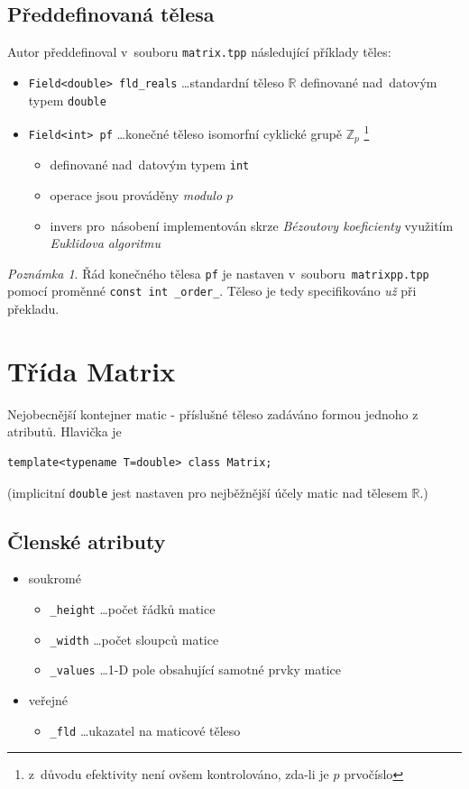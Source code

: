 \documentclass[11pt,a4paper]{article}
\newcommand{\R}{\mathbb{R}}
\theoremstyle{remark}
\newtheorem{note}[thm]{Poznámka}
\begin{document}
\subsection{Předdefinovaná tělesa}
 
Autor předdefinoval v~souboru \verb=matrix.tpp= následující příklady těles:
\begin{itemize}
  \item \verb=Field<double> fld_reals= \ldots standardní těleso $\R$ definované
    nad~datovým typem \verb=double=
  \item \verb=Field<int> pf= \ldots konečné těleso isomorfní cyklické grupě
    $\mathbb{Z}_p$\thinspace%
    \footnote{z~důvodu efektivity není ovšem kontrolováno, zda-li je $p$
    prvočíslo}
    \begin{itemize}
      \item definované nad~datovým typem \verb=int=
      \item operace jsou prováděny \emph{modulo $p$\/}
      \item invers pro~násobení implementován skrze \emph{Bézoutovy
        koeficienty\/} využitím \emph{Euklidova algoritmu\/}
    \end{itemize}
\end{itemize}

\begin{note}
  Řád konečného tělesa \verb=pf= je nastaven v~souboru~\verb=matrixpp.tpp=
  pomocí proměnné \verb=const int _order_=.
  Těleso je tedy specifikováno \emph{už\/} při překladu.
\end{note}

\section{Třída Matrix}

Nejobecnější kontejner matic - příslušné těleso zadáváno formou jednoho z
atributů.
Hlavička je
\begin{verbatim}
template<typename T=double> class Matrix;
\end{verbatim}
(implicitní \verb=double= jest nastaven pro nejběžnější účely matic nad tělesem
$\R$.)

\subsection{Členské atributy}

\begin{itemize}
  \item soukromé
  \begin{itemize}
    \item \verb=_height= \ldots počet řádků matice
    \item \verb=_width= \ldots počet sloupců matice
    \item \verb=_values= \ldots 1-D pole obsahující samotné prvky matice
  \end{itemize}
  \item veřejné
  \begin{itemize}
    \item \verb=_fld= \ldots ukazatel na maticové těleso
  \end{itemize}
\end{itemize}
\end{document}
